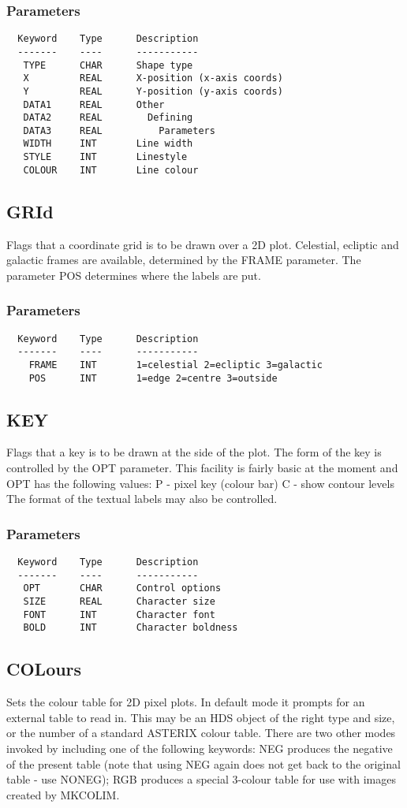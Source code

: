 \documentclass{book}
\renewcommand{\_}{{\tt\char'137}}     %
\begin{document}
\subsubsection{Parameters}
\begin{verbatim}
  Keyword    Type      Description
  -------    ----      -----------
   TYPE      CHAR      Shape type
   X         REAL      X-position (x-axis coords)
   Y         REAL      Y-position (y-axis coords)
   DATA1     REAL      Other
   DATA2     REAL        Defining
   DATA3     REAL          Parameters
   WIDTH     INT       Line width
   STYLE     INT       Linestyle
   COLOUR    INT       Line colour

\end{verbatim}\subsection{GRId}
Flags that a coordinate grid is to be drawn over a 2D plot.
Celestial, ecliptic and galactic frames are available,
determined by the FRAME parameter. The parameter POS
determines where the labels are put.

\subsubsection{Parameters}
\begin{verbatim}
  Keyword    Type      Description
  -------    ----      -----------
    FRAME    INT       1=celestial 2=ecliptic 3=galactic
    POS      INT       1=edge 2=centre 3=outside

\end{verbatim}\subsection{KEY}
Flags that a key is to be drawn at the side of the plot. The form
of the key is controlled by the OPT parameter. This facility is
fairly basic at the moment and OPT has the following values:
P - pixel key (colour bar)
C - show contour levels
The format of the textual labels may also be controlled.
\subsubsection{Parameters}
\begin{verbatim}
  Keyword    Type      Description
  -------    ----      -----------
   OPT       CHAR      Control options
   SIZE      REAL      Character size
   FONT      INT       Character font
   BOLD      INT       Character boldness
\end{verbatim}\subsection{COLours}
Sets the colour table for 2D pixel plots. In default mode
it prompts for an external table to read in. This may be an
HDS object of the right type and size, or the number of a
standard ASTERIX colour table. There are two other modes
invoked by including one of the following keywords: NEG produces
the negative of the present table (note that using NEG again does
not get back to the original table - use NONEG); RGB produces a
special 3-colour table for use with images created by MKCOLIM.
\end{document}
